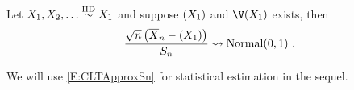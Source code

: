 {\begin{prop}
Let $X_1,X_2,\ldots \overset{{\rm IID}}{\sim} X_1$ and suppose $\mathscr{(}X_1)$ and $\V(X_1)$ exists, then
\begin{equation}\label{E:CLTApproxSn}
\frac{\sqrt{n} \left( \overline{X}_n - \mathscr{(}X_1) \right)}{S_n} \rightsquigarrow \mbox{{\rm Normal}}(0,1) \ .
\end{equation}
\end{prop}

We will use \eqref{E:CLTApproxSn} for statistical estimation in the sequel.
}%






